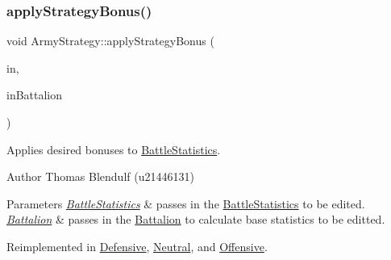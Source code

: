 \subsubsection{\texorpdfstring{applyStrategyBonus()}{applyStrategyBonus()}}
{\footnotesize\ttfamily void Army\+Strategy\+::apply\+Strategy\+Bonus (\begin{DoxyParamCaption}\item[{\mbox{\hyperlink{class_battle_statistics}{Battle\+Statistics}}}]{in,  }\item[{\mbox{\hyperlink{class_battalion}{Battalion}} $\ast$}]{in\+Battalion }\end{DoxyParamCaption})\hspace{0.3cm}{\ttfamily [virtual]}}



Applies desired bonuses to \mbox{\hyperlink{class_battle_statistics}{Battle\+Statistics}}. 

\begin{DoxyAuthor}{Author}
Thomas Blendulf (u21446131) 
\end{DoxyAuthor}

\begin{DoxyParams}{Parameters}
{\em \mbox{\hyperlink{class_battle_statistics}{Battle\+Statistics}}} & passes in the \mbox{\hyperlink{class_battle_statistics}{Battle\+Statistics}} to be edited. \\
\hline
{\em \mbox{\hyperlink{class_battalion}{Battalion}}} & passes in the \mbox{\hyperlink{class_battalion}{Battalion}} to calculate base statistics to be editted. \\
\hline
\end{DoxyParams}


Reimplemented in \mbox{\hyperlink{class_defensive_a6585a77b2d245fc8671fbf959483e1e0}{Defensive}}, \mbox{\hyperlink{class_neutral_aa6ce5f87e34cf849324d42031e2901d1}{Neutral}}, and \mbox{\hyperlink{class_offensive_aaaaf9b44b3fa438b5067c01463b3353a}{Offensive}}.

